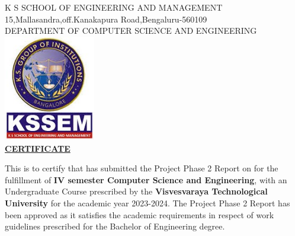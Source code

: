 \documentclass[a4paper]{article}
\begin{document}
	\begin{titlepage}
		\begin{tcolorbox}[colframe=black, colback=white, boxrule=2pt, arc=0pt,
			outer arc=0pt]
			\begin{center}
				\vspace{1cm}
				\textbf\Large{K S SCHOOL OF ENGINEERING AND MANAGEMENT \\[4pt]
					15,Mallasandra,off.Kanakapura Road,Bengaluru-560109 \\[7pt]
					DEPARTMENT OF COMPUTER SCIENCE AND ENGINEERING\\
				}
				\vspace{1cm}
				\includegraphics[width=0.3\textwidth]{logo1.jpeg}\\
				\vspace{1cm}
				\textbf{\underline{CERTIFICATE}}
			\end{center}
			This is to certify that \textbf{\color{blue}{Bourisetti. Chaitanya}} has submitted
			the Project Phase 2 Report on \textbf{\color{blue}{Early Detection of OCD
					Symptoms Using Machine Learning}} for the fulfillment of \textbf{IV
				semester Computer Science and Engineering}, with an Undergraduate Course
			prescribed by the \textbf{Visvesvaraya Technological University} for the
			academic year 2023-2024. The Project Phase 2 Report has been approved as
			it satisfies the academic requirements in respect of work guidelines
			prescribed for the Bachelor of Engineering degree.
			\vspace{2cm}
			

\end{tcolorbox}
\end{titlepage}
\end{document}
